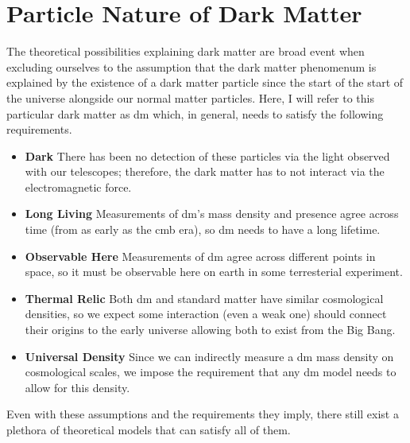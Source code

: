 \section{Particle Nature of Dark Matter}
The theoretical possibilities explaining dark matter are broad \cite{darksectors-2016}
event when excluding ourselves to the assumption that the dark matter phenomenum is explained
by the existence of a dark matter particle since the start of the start of the universe alongside
our normal matter particles. Here, I will refer to this particular dark matter
as \gls{dm} which, in general, needs to satisfy the following requirements.
\begin{itemize}
      \item \textbf{Dark} There has been no detection of these particles via the light observed with our telescopes;
            therefore, the dark matter has to not interact via the electromagnetic force.
      \item \textbf{Long Living} Measurements of \gls{dm}'s mass density and presence agree across time
            (from as early as the \gls{cmb} era), so \gls{dm} needs to have a long lifetime.
      \item \textbf{Observable Here} Measurements of \gls{dm} agree across different points in space,
            so it must be observable here on earth in some terresterial experiment.
      \item \textbf{Thermal Relic} Both \gls{dm} and standard matter have similar
            cosmological densities, so we expect some interaction (even a weak one) should connect their
            origins to the early universe allowing both to exist from the Big Bang.
      \item \textbf{Universal Density} Since we can indirectly measure a \gls{dm} mass density on
            cosmological scales, we impose the requirement that any \gls{dm} model needs to allow for
            this density.
\end{itemize}
Even with these assumptions and the requirements they imply, there still exist a plethora of
theoretical models that can satisfy all of them.

